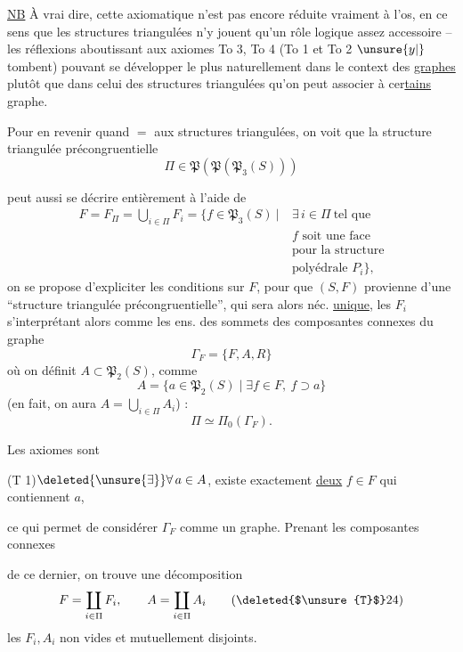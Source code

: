 \uline{NB} À vrai dire, cette axiomatique n'est pas encore réduite vraiment à l'os, en ce sens que les structures triangulées n'y jouent qu'un rôle logique assez accessoire -- les réflexions aboutissant aux axiomes To 3, To 4 (To 1 et To 2 $\unsure{y|{}}$ tombent) pouvant se développer le plus naturellement dans le context des \uline{graphes} plutôt que dans celui des structures triangulées qu'on peut associer à cer\uline{tains} graphe.

Pour en revenir quand $=$ aux structures triangulées, on voit que la structure triangulée précongruentielle
\[
\Pi\in\mathfrak P(\mathfrak P(\mathfrak P_3(S)))\tag*{(19)}
\]


peut aussi se décrire entièrement à l'aide de
\[
\begin{aligned}
F=F_\Pi=\bigcup_{i\in\Pi}F_i=\bigl\{f\in\mathfrak P_3(S)\ \big|\ &\exists\,i\in\Pi\ \text{tel que}\\
& f\text{ soit une face}\\
&\text{pour la structure}\\
&\text{polyédrale }P_i\bigr\},
\end{aligned}\tag*{(20)}
\]
on se propose d'expliciter les conditions sur $F$, pour que $(S,F)$ provienne d'une ``structure triangulée précongruentielle'', qui sera alors néc. \uline{unique}, les $F_i$ s'interprétant alors comme les ens. des sommets des composantes connexes du graphe
\[
\Gamma_F=\{F,A,R\}\tag*{(21)}
\]
où on définit $A\subset\mathfrak P_2(S)$,  comme
\[
A=\{a\in\mathfrak P_2(S)\mid\exists f\in F,\ f\supset a\}\tag*{(22)}
\]
(en fait, on aura $A=\bigcup_{i\in\Pi}A_i$) :
\[
\Pi\simeq\Pi_0(\Gamma_F).\tag*{(23)}
\]

Les axiomes sont


(T 1)\qquad $\deleted{\unsure{\exists}}\forall\,a\in A$, existe exactement \uline{deux} $f\in F$ qui contiennent $a$,

ce qui permet de considérer $\Gamma_F$ comme un graphe. Prenant les composantes connexes


de ce dernier, on trouve une décomposition
\[
F=\coprod_{i\in\Pi}F_i,\qquad A=\coprod_{i\in\Pi}A_i\tag*{(\deleted{$\unsure{T}$}24)}
\]
les $F_i,A_i$ non vides et mutuellement disjoints.

